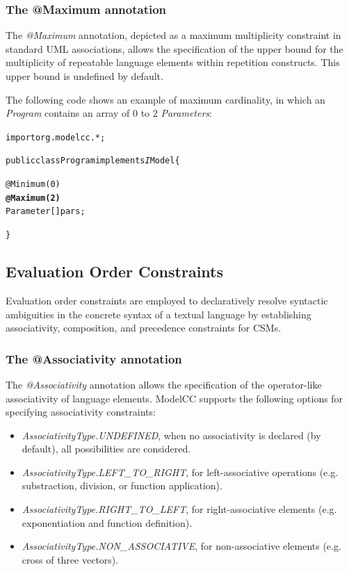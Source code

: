 \documentclass[a4paper,twoside,onecolumn]{article}
\newenvironment{colframe}{%
  \begin{Sbox} 
    \begin{minipage}{.8\columnwidth} 
}{%

  \end{minipage} 
  \end{Sbox} 
  \begin{center} 
    \fcolorbox{black}{MyGray}{\TheSbox} 
  \end{center} 
}
\newcommand{\an}[1]{\emph{#1}} %
\begin{document}
\subsubsection{The @Maximum annotation}

The \an{@Maximum} annotation, depicted as a maximum multiplicity constraint in standard UML associations, allows the specification of the upper
bound for the multiplicity of repeatable language elements within repetition constructs. This upper bound is undefined by default.

The following code shows an example of maximum cardinality, in which an \emph{Program} contains an array of $0$ to $2$ \emph{Parameters}:

\begin{colframe}
\begin{alltt}
import org.modelcc.*;

public class Program implements{\emph IModel} \{

  @Minimum(0)
  {\bf @Maximum(2)}
  Parameter[] pars;

\}
\end{alltt}
\end{colframe}

\subsection{Evaluation Order Constraints}

Evaluation order constraints are employed to declaratively resolve syntactic ambiguities in the concrete syntax of a textual language by establishing associativity, composition, and precedence constraints for CSMs.

\subsubsection{The @Associativity annotation}

The \an{@Associativity} annotation allows the specification of the operator-like associativity of language elements. ModelCC supports the
following options for specifying associativity constraints:
%
\begin{itemize}
%
%
\item \an{AssociativityType.UNDEFINED}, when no associativity is declared (by default), all possibilities are considered.
%
%
\item \an{AssociativityType.LEFT\_TO\_RIGHT}, for left-associative operations (e.g. substraction, division, or function application).
%
%
\item \an{AssociativityType.RIGHT\_TO\_LEFT}, for right-associative elements (e.g. exponentiation and function definition).
%
%
\item \an{AssociativityType.NON\_ASSOCIATIVE}, for non-associative elements (e.g. cross of three vectors).
%
\end{itemize}
\end{document}
